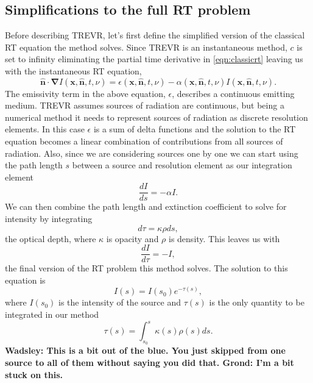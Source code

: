 \documentclass[fleq,usenatbib]{mnras}
\newcommand{\acro}{TREVR}
\newcommand{\comment}[1]{\textbf{\color{red}#1}}
\begin{document}
\subsection{Simplifications to the full RT problem}\label{sec:rteq}
Before describing \acro{}, let's first define the 
simplified version of the classical RT equation the method solves. Since 
\acro{} is an instantaneous method, $c$ is set to infinity eliminating the 
partial time derivative in \ref{eqn:classicrt} leaving us with the 
instantaneous RT equation,
\begin{equation} \label{infcrt}
\mathbf{\hat{n} \cdot \nabla} I\left(\mathbf{x}, \mathbf{\hat{n}}, t, 
\nu\right) = \epsilon\left(\mathbf{x}, \mathbf{\hat{n}}, t, \nu\right) - 
\alpha\left(\mathbf{x}, \mathbf{\hat{n}}, t, \nu\right) 
I\left(\mathbf{x}, \mathbf{\hat{n}}, t, \nu\right).
\end{equation}
The emissivity term in the above equation, $\epsilon$, describes a continuous 
emitting medium. \acro{} assumes sources of radiation are continuous, but 
being a numerical method it needs to represent sources of radiation as 
discrete resolution elements. In this case $\epsilon$ is a sum of delta 
functions and the solution to the RT equation becomes a linear combination of 
contributions from all sources of radiation. Also, since we are considering 
sources one by one we can start using the path length $s$ between a source and 
resolution element as our integration element
\begin{equation}
\label{eqn:combtransfer}
\frac{dI}{ds} = -\alpha I.
\end{equation}
We can then combine the path length and extinction coefficient to solve for 
intensity by integrating 
\begin{equation}
\label{eqn:dtau}
d\tau = \kappa \rho ds, 
\end{equation}
the optical depth, where $\kappa$ is opacity and $\rho$ is density. This 
leaves us with
\begin{equation}
\label{eqn:absorbtransfer}
\frac{dI}{d\tau} = -I,
\end{equation}
the final version of the RT problem this method solves. The solution to this 
equation is 
\begin{equation}
\label{eqn:ient}
I(s) = I(s_0)e^{-\tau(s)},
\end{equation}
where $I(s_0)$ is the intensity of the source and $\tau(s)$ is the only
quantity to be integrated in our method
\begin{equation}
\label{eqn:tauint}
\tau(s) = \int_{s_0}^s \kappa(s) \rho(s) ds.
\end{equation}
\comment{Wadsley: This is a bit out of the blue. You just skipped from one 
source to all of them without saying you did that. Grond: I'm a bit stuck on 
this.}
\end{document}

